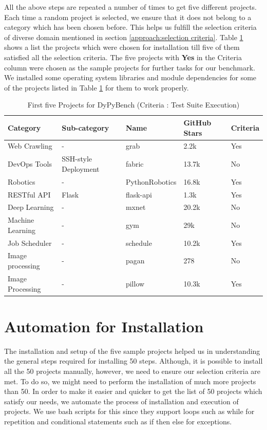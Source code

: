 All the above steps are repeated a number of times to get five different projects.
Each time a random project is selected, we ensure that it does not belong to a category which has been chosen before.
This helps us fulfill the selection criteria of diverse domain mentioned in section \ref{approach:selection criteria}.
Table \ref{table:first_5_projects} shows a list the projects which were chosen for installation till five of them satisfied all the selection criteria.
The five projects with \textbf{Yes} in the Criteria column were chosen as the sample projects for further tasks for our benchmark.
We installed some operating system libraries and module dependencies for some of the projects listed in Table \ref{table:first_5_projects} for them to work properly.  

\begin{table}[ht]
    \centering
    \begin{tabular}{lllll}
    \hline
    \textbf{Category} & \textbf{Sub-category} & \textbf{Name} & \textbf{GitHub Stars} & \textbf{Criteria}\\
    \hline
    Web Crawling & - & grab & 2.2k & Yes\\
    DevOps Tools & SSH-style Deployment & fabric & 13.7k & No\\
    Robotics & - & PythonRobotics & 16.8k & Yes\\
    RESTful API & Flask & flask-api & 1.3k & Yes\\
    Deep Learning & - & mxnet & 20.2k & No\\
    Machine Learning & - & gym & 29k & No\\
    Job Scheduler & - & schedule & 10.2k & Yes\\
    Image processing & - & pagan & 278 & No\\
    Image Processing & - & pillow & 10.3k & Yes\\
    \hline
    \end{tabular}
    \caption{First five Projects for DyPyBench (Criteria : Test Suite Execution)}
    \label{table:first_5_projects}
\end{table}

\section{Automation for Installation}
\label{impl:Automation for Installation}
The installation and setup of the five sample projects helped us in understanding the general steps required for installing 50 steps.
Although, it is possible to install all the 50 projects manually, however, we need to ensure our selection criteria are met.
To do so, we might need to perform the installation of much more projects than 50.
In order to make it easier and quicker to get the list of 50 projects which satisfy our needs, we automate the process of installation and execution of projects.
We use bash scripts for this since they support loops such as while for repetition and conditional statements such as if then else for exceptions.

